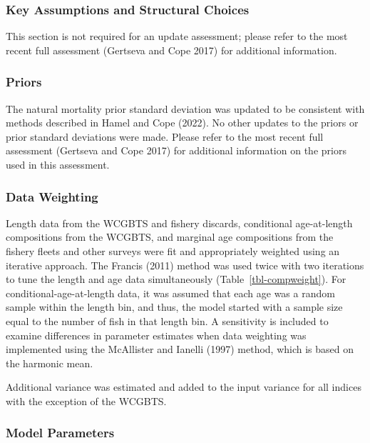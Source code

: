 \documentclass[
]{scrartcl}
\begin{document}
\subsubsection{Key Assumptions and Structural
Choices}\label{key-assumptions-and-structural-choices}

This section is not required for an update assessment; please refer to
the most recent full assessment (Gertseva and Cope 2017) for additional
information.

\subsubsection{Priors}\label{priors}

The natural mortality prior standard deviation was updated to be
consistent with methods described in Hamel and Cope (2022). No other
updates to the priors or prior standard deviations were made. Please
refer to the most recent full assessment (Gertseva and Cope 2017) for
additional information on the priors used in this assessment.

\subsubsection{Data Weighting}\label{data-weighting}

Length data from the WCGBTS and fishery discards, conditional
age-at-length compositions from the WCGBTS, and marginal age
compositions from the fishery fleets and other surveys were fit and
appropriately weighted using an iterative approach. The Francis (2011)
method was used twice with two iterations to tune the length and age
data simultaneously (Table~\ref{tbl-compweight}). For
conditional-age-at-length data, it was assumed that each age was a
random sample within the length bin, and thus, the model started with a
sample size equal to the number of fish in that length bin. A
sensitivity is included to examine differences in parameter estimates
when data weighting was implemented using the McAllister and Ianelli
(1997) method, which is based on the harmonic mean.

Additional variance was estimated and added to the input variance for
all indices with the exception of the WCGBTS.

\subsubsection{Model Parameters}\label{model-parameters}
\end{document}
